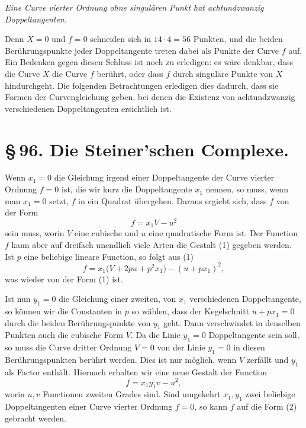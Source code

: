 \documentclass[11pt]{article}
\begin{document}
\emph{Eine Curve vierter Ordnung ohne singulären Punkt hat achtundzwanzig Doppeltangenten.}

Denn \(X=0\) und \(f=0\) schneiden sich in \(14\cdot4=56\) Punkten, und die beiden Berührungspunkte jeder Doppeltangente treten dabei als Punkte der Curve \(f\) auf. Ein Bedenken gegen diesen Schluss ist noch zu erledigen: es wäre denkbar, dass die Curve \(X\) die Curve \(f\) berührt, oder dass \(f\) durch singuläre Punkte von \(X\) hindurchgeht. Die folgenden Betrachtungen erledigen dies dadurch, dass sie Formen der Curvengleichung geben, bei denen die Existenz von achtundzwanzig verschiedenen Doppeltangenten ersichtlich ist.

\section*{\S\,96. Die Steiner'schen Complexe.}

Wenn \(x_1=0\) die Gleichung irgend einer Doppeltangente der Curve vierter Ordnung \(f=0\) ist, die wir kurz die Doppeltangente \(x_1\) nennen, so muss, wenn man \(x_1=0\) setzt, \(f\) in ein Quadrat übergehen. Daraus ergiebt sich, dass \(f\) von der Form
\begin{equation}
 f=x_1V-u^2
 \tag{1}
\end{equation}
sein muss, worin \(V\) eine cubische und \(u\) eine quadratische Form ist. Der Function \(f\) kann aber auf dreifach unendlich viele Arten die Gestalt (1) gegeben werden. Ist \(p\) eine beliebige lineare Function, so folgt aus (1)
\[
 f=x_1\bigl(V+2pu+p^2x_1\bigr)-(u+px_1)^2,
\]
was wieder von der Form (1) ist.

Ist nun \(y_1=0\) die Gleichung einer zweiten, von \(x_1\) verschiedenen Doppeltangente, so können wir die Constanten in \(p\) so wählen, dass der Kegelschnitt \(u+px_1=0\) durch die beiden Berührungspunkte von \(y_1\) geht. Dann verschwindet in denselben Punkten auch die cubische Form \(V\). Da die Linie \(y_1=0\) Doppeltangente sein soll, so muss die Curve dritter Ordnung \(V=0\) von der Linie \(y_1=0\) in diesen Berührungspunkten berührt werden. Dies ist nur möglich, wenn \(V\) zerfällt und \(y_1\) als Factor enthält. Hiernach erhalten wir eine neue Gestalt der Function
\begin{equation}
 f=x_1y_1v-u^2,
 \tag{2}
\end{equation}
worin \(u,v\) Functionen zweiten Grades sind. Sind umgekehrt \(x_1,y_1\) zwei beliebige Doppeltangenten einer Curve vierter Ordnung \(f=0\), so kann \(f\) auf die Form (2) gebracht werden.
\end{document}
